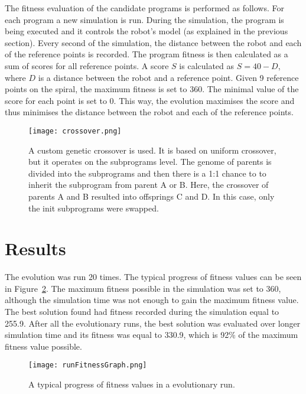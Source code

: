 \documentclass{ExcelAtFIT}
\begin{document}
The fitness evaluation of the candidate programs is performed as follows.
For each program a new simulation is run.
During the simulation, the program is being executed and it controls the robot's model (as explained in the previous section).
Every second of the simulation, the distance between the robot and each of the reference points is recorded.
The program fitness is then calculated as a sum of scores for all reference points.
A score $S$ is calculated as $S = 40 - D$, where $D$ is a distance between the robot and a reference point.
Given 9 reference points on the spiral, the maximum fitness is set to 360.
The minimal value of the score for each point is set to 0.
This way, the evolution maximises the score and thus minimises the distance between the robot and each of the reference points.

\begin{figure}[t]
	\centering
	{\texttt{[image: crossover.png]}}
	\caption{
	A custom genetic crossover is used.
	It is based on uniform crossover, but it operates on the subprograms level.
	The genome of parents is divided into the subprograms and then there is a 1:1 chance to to inherit the subprogram from parent A or B.
	Here, the crossover of parents A and B resulted into offsprings C and D.
	In this case, only the init subprograms were swapped.
	}
	\label{fig:Crossover}
\end{figure}




\section{Results}
The evolution was run 20 times.
The typical progress of fitness values can be seen in Figure~\ref{fig:FitnessGraph}.
The maximum fitness possible in the simulation was set to 360, although the simulation time was not enough to gain the maximum fitness value.
The best solution found had fitness recorded during the simulation equal to 255.9.
After all the evolutionary runs, the best solution was evaluated over longer simulation time and its fitness was equal to 330.9, which is 92\% of the maximum fitness value possible.

\begin{figure}[t]
	\centering
	{\texttt{[image: runFitnessGraph.png]}}
	\caption{
	A typical progress of fitness values in a evolutionary run.
	}
	\label{fig:FitnessGraph}
\end{figure}
\end{document}
